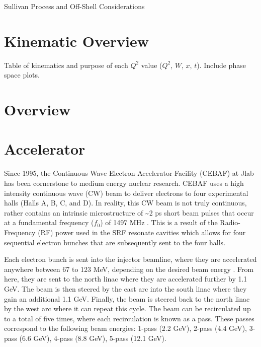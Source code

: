 \documentclass[
]{report}
\begin{document}
Sullivan Process and Off-Shell Considerations

\hypertarget{Section-3.6}{%
\section{Kinematic Overview}\label{Section-3.6}}

Table of kinematics and purpose of each \(Q^2\) value (\(Q^2\), \(W\),
\(x\), \(t\)). Include phase space plots.
\label{Chapter-4}

\hypertarget{Section-4.1}{%
\section{Overview}\label{Section-4.1}}

\hypertarget{Section-4.2}{%
\section{Accelerator}\label{Section-4.2}}

Since 1995, the Continuous Wave Electron Accelerator Facility (CEBAF) at
Jlab has been cornerstone to medium energy nuclear research. CEBAF uses
a high intensity continuous wave (CW) beam to deliver electrons to four
experimental halls (Halls A, B, C, and D). In reality, this CW beam is
not truly continuous, rather contains an intrinsic microstructure of
\textasciitilde2 ps short beam pulses that occur at a fundamental
frequency (\(f_0\)) of 1497 MHz \cite{reece_continuous_2016}. This is a
result of the Radio-Frequency (RF) power used in the SRF resonate
cavities which allows for four sequential electron bunches that are
subsequently sent to the four halls.



Each electron bunch is sent into the injector beamline, where they are
accelerated anywhere between 67 to 123 MeV, depending on the desired
beam energy \cite{pilat_12_2012}. From here, they are sent to the north
linac where they are accelerated further by 1.1 GeV. The beam is then
steered by the east arc into the south linac where they gain an
additional 1.1 GeV. Finally, the beam is steered back to the north linac
by the west arc where it can repeat this cycle. The beam can be
recirculated up to a total of five times, where each recirculation is
known as a pass. These passes correspond to the following beam energies:
1-pass (2.2 GeV), 2-pass (4.4 GeV), 3-pass (6.6 GeV), 4-pass (8.8 GeV),
5-pass (12.1 GeV).
\end{document}
